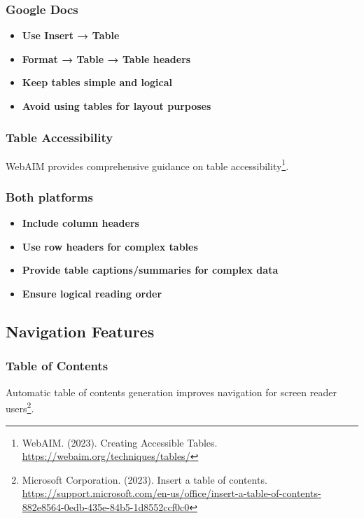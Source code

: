 \subsubsection{Google Docs}
\vspace{1em}
\begin{itemize}
\item \textbf{Use Insert → Table}
\item \textbf{Format → Table → Table headers}
\item \textbf{Keep tables simple and logical}
\item \textbf{Avoid using tables for layout purposes}
\end{itemize}
\vspace{1em}

\subsubsection{Table Accessibility}
WebAIM provides comprehensive guidance on table accessibility\footnote{WebAIM. (2023). Creating Accessible Tables. \url{https://webaim.org/techniques/tables/}}.

\subsubsection{Both platforms}
\vspace{1em}
\begin{itemize}
\item \textbf{Include column headers}
\item \textbf{Use row headers for complex tables}
\item \textbf{Provide table captions/summaries for complex data}
\item \textbf{Ensure logical reading order}
\end{itemize}
\vspace{1em}

\subsection{Navigation Features}

\subsubsection{Table of Contents}
Automatic table of contents generation improves navigation for screen reader users\footnote{Microsoft Corporation. (2023). Insert a table of contents. \url{https://support.microsoft.com/en-us/office/insert-a-table-of-contents-882e8564-0edb-435e-84b5-1d8552ccf0c0}}.

